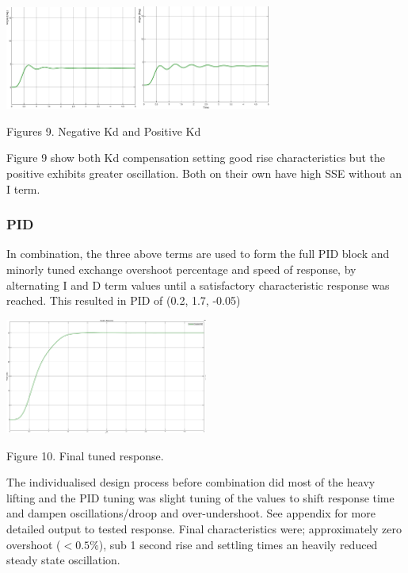 \documentclass[a4paper,11pt]{article}
\begin{document}
{\centering\includegraphics[width=0.33\textwidth]{inc/kd.png}\includegraphics[width=0.33\textwidth]{inc/kd_pos.png}\\}
\begin{center}
        Figures 9. Negative Kd and Positive Kd
\end{center}

Figure 9 show both Kd compensation setting good rise characteristics but the positive exhibits greater oscillation. Both on their own have high SSE without an I term. 

\subsubsection{PID}
In combination, the three above terms are used to form the full PID block and minorly tuned exchange overshoot percentage and speed of response, by alternating I and D term values until a satisfactory characteristic response was reached. This resulted in PID of (0.2, 1.7, -0.05)

{\centering\includegraphics[width=0.5\textwidth]{inc/PID_final.png}\\}
\begin{center}
        Figure 10. Final tuned response.
\end{center}

The individualised design process before combination did most of the heavy lifting and the PID tuning was slight tuning of the values to shift response time and dampen oscillations/droop and over-undershoot. See appendix for more detailed output to tested response. Final characteristics were; approximately zero overshoot ($<0.5\%$), sub 1 second rise and settling times an heavily reduced steady state oscillation. 
 
\end{document}

